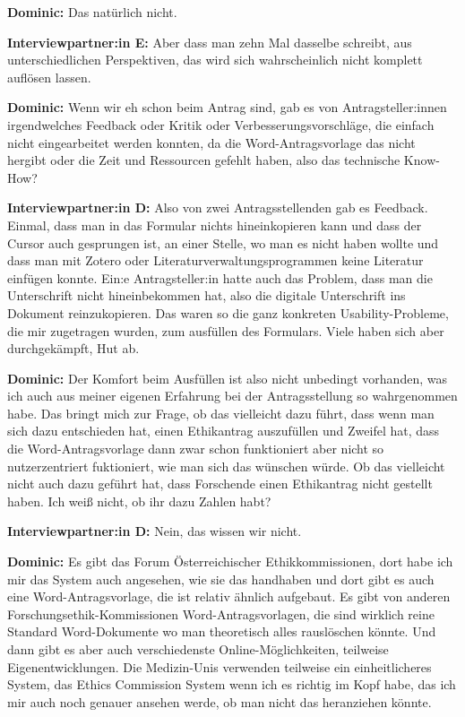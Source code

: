 \documentclass[a4paper,12pt,twoside]{scrreprt}
\begin{document}
\textbf{Dominic:} Das natürlich nicht.

\textbf{Interviewpartner:in E:} Aber dass man zehn Mal dasselbe schreibt, aus unterschiedlichen Perspektiven, das wird sich wahrscheinlich nicht komplett auflösen lassen.

\textbf{Dominic:} Wenn wir eh schon beim Antrag sind, gab es von Antragsteller:innen irgendwelches Feedback oder Kritik oder Verbesserungsvorschläge, die einfach nicht eingearbeitet werden konnten, da die Word-Antragsvorlage das nicht hergibt oder die Zeit und Ressourcen gefehlt haben, also das technische Know-How?

\textbf{Interviewpartner:in D:} Also von zwei Antragsstellenden gab es Feedback. Einmal, dass man in das Formular nichts hineinkopieren kann und dass der Cursor auch gesprungen ist, an einer Stelle, wo man es nicht haben wollte und dass man mit Zotero oder Literaturverwaltungsprogrammen keine Literatur einfügen konnte. Ein:e Antragsteller:in hatte auch das Problem, dass man die Unterschrift nicht hineinbekommen hat, also die digitale Unterschrift ins Dokument reinzukopieren. Das waren so die ganz konkreten Usability-Probleme, die mir zugetragen wurden, zum ausfüllen des Formulars. Viele haben sich aber durchgekämpft, Hut ab.

\textbf{Dominic:} Der Komfort beim Ausfüllen ist also nicht unbedingt vorhanden, was ich auch aus meiner eigenen Erfahrung bei der Antragsstellung so wahrgenommen habe. Das bringt mich zur Frage, ob das vielleicht dazu führt, dass wenn man sich dazu entschieden hat, einen Ethikantrag auszufüllen und Zweifel hat, dass die Word-Antragsvorlage dann zwar schon funktioniert aber nicht so nutzerzentriert fuktioniert, wie man sich das wünschen würde. Ob das vielleicht nicht auch dazu geführt hat, dass Forschende einen Ethikantrag nicht gestellt haben. Ich weiß nicht, ob ihr dazu Zahlen habt?

\textbf{Interviewpartner:in D:} Nein, das wissen wir nicht.

\textbf{Dominic:} Es gibt das Forum Österreichischer Ethikkommissionen, dort habe ich mir das System auch angesehen, wie sie das handhaben und dort gibt es auch eine Word-Antragsvorlage, die ist relativ ähnlich aufgebaut. Es gibt von anderen Forschungsethik-Kommissionen Word-Antragsvorlagen, die sind wirklich reine Standard Word-Dokumente wo man theoretisch alles rauslöschen könnte. Und dann gibt es aber auch verschiedenste Online-Möglichkeiten, teilweise Eigenentwicklungen. Die Medizin-Unis verwenden teilweise ein einheitlicheres System, das Ethics Commission System wenn ich es richtig im Kopf habe, das ich mir auch noch genauer ansehen werde, ob man nicht das heranziehen könnte.
\end{document}
